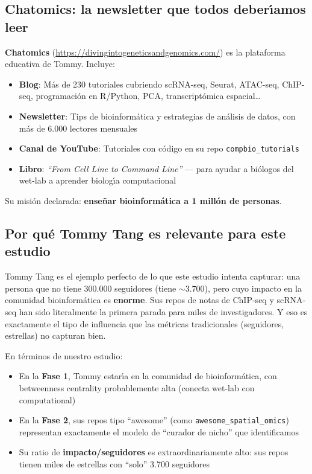 \documentclass[11pt]{article}
\begin{document}
\subsection{Chatomics: la newsletter que todos deber\'{\i}amos leer}

\textbf{Chatomics} (\url{https://divingintogeneticsandgenomics.com/}) es la plataforma educativa de Tommy. Incluye:

\begin{itemize}
    \item \textbf{Blog}: M\'{a}s de 230 tutoriales cubriendo scRNA-seq, Seurat, ATAC-seq, ChIP-seq, programaci\'{o}n en R/Python, PCA, transcript\'{o}mica espacial\ldots{}
    \item \textbf{Newsletter}: Tips de bioinform\'{a}tica y estrategias de an\'{a}lisis de datos, con m\'{a}s de 6.000 lectores mensuales
    \item \textbf{Canal de YouTube}: Tutoriales con c\'{o}digo en su repo \texttt{compbio\_tutorials}
    \item \textbf{Libro}: \textit{``From Cell Line to Command Line''} --- para ayudar a bi\'{o}logos del wet-lab a aprender biolog\'{\i}a computacional
\end{itemize}

Su misi\'{o}n declarada: \textbf{ense\~{n}ar bioinform\'{a}tica a 1 mill\'{o}n de personas}.

\subsection{Por qu\'{e} Tommy Tang es relevante para este estudio}

Tommy Tang es el ejemplo perfecto de lo que este estudio intenta capturar: una persona que no tiene 300.000 seguidores (tiene $\sim$3.700), pero cuyo impacto en la comunidad bioinform\'{a}tica es \textbf{enorme}. Sus repos de notas de ChIP-seq y scRNA-seq han sido literalmente la primera parada para miles de investigadores. Y eso es exactamente el tipo de influencia que las m\'{e}tricas tradicionales (seguidores, estrellas) no capturan bien.

En t\'{e}rminos de nuestro estudio:
\begin{itemize}
    \item En la \textbf{Fase 1}, Tommy estar\'{\i}a en la comunidad de bioinform\'{a}tica, con betweenness centrality probablemente alta (conecta wet-lab con computational)
    \item En la \textbf{Fase 2}, sus repos tipo ``awesome'' (como \texttt{awesome\_spatial\_omics}) representan exactamente el modelo de ``curador de nicho'' que identificamos
    \item Su ratio de \textbf{impacto/seguidores} es extraordinariamente alto: sus repos tienen miles de estrellas con ``solo'' 3.700 seguidores
\end{itemize}
\end{document}
